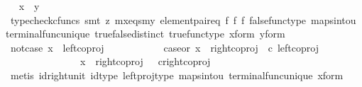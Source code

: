 \begin{isabellebody}
\ \isamarkupfalse%
\ {\isachardoublequoteopen}x\ {\isacharequal}{\kern0pt}\ y{\isachardoublequoteclose}\isanewline
\ \ \ \ \ \ \isamarkupfalse%
\ {\isacharparenleft}{\kern0pt}typecheck{\isacharunderscore}{\kern0pt}cfuncs{\isacharcomma}{\kern0pt}\ smt\ {\isacharparenleft}{\kern0pt}z{}{\isacharparenright}{\kern0pt}\ mx{\isacharunderscore}{\kern0pt}eqs{\isacharunderscore}{\kern0pt}my\ element{\isacharunderscore}{\kern0pt}pair{\isacharunderscore}{\kern0pt}eq\ f{}\ f{}\ f{}\ false{\isacharunderscore}{\kern0pt}func{\isacharunderscore}{\kern0pt}type\ maps{\isacharunderscore}{\kern0pt}into{\isacharunderscore}{\kern0pt}{}u{}\ terminal{\isacharunderscore}{\kern0pt}func{\isacharunderscore}{\kern0pt}unique\ true{\isacharunderscore}{\kern0pt}false{\isacharunderscore}{\kern0pt}distinct\ true{\isacharunderscore}{\kern0pt}func{\isacharunderscore}{\kern0pt}type\ x{\isacharunderscore}{\kern0pt}form\ y{\isacharunderscore}{\kern0pt}form{\isacharparenright}{\kern0pt}\isanewline
\ \ \isamarkupfalse%
\isanewline
\ \ \ \ \isamarkupfalse%
\ not{\isacharunderscore}{\kern0pt}case{}{\isacharcolon}{\kern0pt}\ {\isachardoublequoteopen}x\ {\isasymnoteq}\ left{\isacharunderscore}{\kern0pt}coproj\ {\isasymone}\ {\isacharparenleft}{\kern0pt}{\isasymone}\ {\isasymCoprod}\ {\isasymone}{\isacharparenright}{\kern0pt}{\isachardoublequoteclose}\isanewline
\ \ \ \ \isamarkupfalse%
\ \isamarkupfalse%
\ case{}{\isacharunderscore}{\kern0pt}or{\isacharunderscore}{\kern0pt}{}{\isacharcolon}{\kern0pt}\ {\isachardoublequoteopen}x\ {\isacharequal}{\kern0pt}\ {\isacharparenleft}{\kern0pt}right{\isacharunderscore}{\kern0pt}coproj\ {\isasymone}\ {\isacharparenleft}{\kern0pt}{\isasymone}{\isasymCoprod}{\isasymone}{\isacharparenright}{\kern0pt}{\isasymcirc}\isactrlsub c\ left{\isacharunderscore}{\kern0pt}coproj\ {\isasymone}\ {\isasymone}{\isacharparenright}{\kern0pt}{\isasymor}\ \isanewline
\ \ \ \ \ \ \ \ \ \ \ \ \ \ \ x\ {\isacharequal}{\kern0pt}\ right{\isacharunderscore}{\kern0pt}coproj\ {\isasymone}\ {\isacharparenleft}{\kern0pt}{\isasymone}{\isasymCoprod}{\isasymone}{\isacharparenright}{\kern0pt}\ {\isasymcirc}\isactrlsub c{\isacharparenleft}{\kern0pt}right{\isacharunderscore}{\kern0pt}coproj\ {\isasymone}\ {\isasymone}{\isacharparenright}{\kern0pt}{\isachardoublequoteclose}\isanewline
\ \ \ \ \ \ \isamarkupfalse%
\ {\isacharparenleft}{\kern0pt}metis\ id{\isacharunderscore}{\kern0pt}right{\isacharunderscore}{\kern0pt}unit{}\ id{\isacharunderscore}{\kern0pt}type\ left{\isacharunderscore}{\kern0pt}proj{\isacharunderscore}{\kern0pt}type\ maps{\isacharunderscore}{\kern0pt}into{\isacharunderscore}{\kern0pt}{}u{}\ terminal{\isacharunderscore}{\kern0pt}func{\isacharunderscore}{\kern0pt}unique\ x{\isacharunderscore}{\kern0pt}form{\isacharparenright}{\kern0pt}\isanewline

\end{isabellebody}
